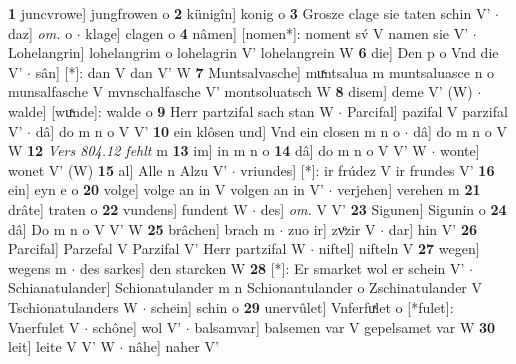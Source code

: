 \documentclass[8pt,a4paper,notitlepage]{article}
\begin{document}
\begin{table}[ht]
\begin{minipage}[t]{0.5\linewidth}
\textbf{1} juncvrowe] jungfrowen o \textbf{2} künigîn] konig o \textbf{3} Grosze clage sie taten schin V'  $\cdot$ daz] \textit{om.} o  $\cdot$ klage] clagen o \textbf{4} nâmen] [nomen*]: noment sv́ V namen sie V'  $\cdot$ Lohelangrin] lohelangrim o lohelagrin V' lohelangrein W \textbf{6} die] Den p o Vnd die V'  $\cdot$ sân] [*]: dan V dan V' W \textbf{7} Muntsalvasche] muͯntsalua m muntsaluasce n o munsalfasche V mvnschalfasche V' montsoluatsch W \textbf{8} disem] deme V' (W)  $\cdot$ walde] [wuͯnde]: walde o \textbf{9} Herr partzifal sach stan W  $\cdot$ Parcifal] pazifal V parzifal V'  $\cdot$ dâ] do m n o V V' \textbf{10} ein klôsen und] Vnd ein closen m n o  $\cdot$ dâ] do m n o V W \textbf{12} \textit{Vers 804.12 fehlt} m  \textbf{13} im] in m n o \textbf{14} dâ] do m n o V V' W  $\cdot$ wonte] wonet V' (W) \textbf{15} al] Alle n Alzu V'  $\cdot$ vriundes] [*]: ir frúdez V ir frundes V' \textbf{16} ein] eyn e o \textbf{20} volge] volge an in V volgen an in V'  $\cdot$ verjehen] verehen m \textbf{21} drâte] traten o \textbf{22} vundens] fundent W  $\cdot$ des] \textit{om.} V V' \textbf{23} Sigunen] Sigunin o \textbf{24} dâ] Do m n o V V' W \textbf{25} brâchen] brach m  $\cdot$ zuo ir] zvͦzir V  $\cdot$ dar] hin V' \textbf{26} Parcifal] Parzefal V Parzifal V' Herr partzifal W  $\cdot$ niftel] nifteln V \textbf{27} wegen] wegens m  $\cdot$ des sarkes] den starcken W \textbf{28} [*]: Er smarket wol er schein V'  $\cdot$ Schianatulander] Schionatulander m n Schionantulander o Zschinatulander V Tschionatulanders W  $\cdot$ schein] schin o \textbf{29} unervûlet] Vnferfuͯlet o [*fulet]: Vnerfulet V  $\cdot$ schône] wol V'  $\cdot$ balsamvar] balsemen var V gepelsamet var W \textbf{30} leit] leite V V' W  $\cdot$ nâhe] naher V' \newline
\end{minipage}
\end{table}
\newpage
\end{document}
